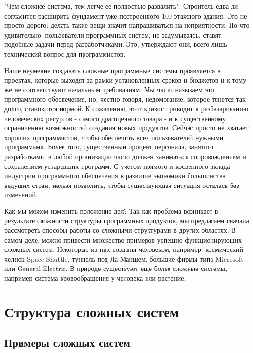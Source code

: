 \documentclass[11pt]{article}
\begin{document}
"Чем сложнее система, тем легче ее полностью развалить". Строитель едва ли согласится расширить фундамент уже построенного 100-этажного здания. Это не просто дорого: делать такие вещи значит напрашиваться на неприятности. Но что удивительно, пользователи программных систем, не задумываясь, ставят подобные задачи перед разработчиками. Это, утверждают они, всего лишь технический вопрос 
для программистов. 
\parskip=2mm
\par
Наше неумение создавать сложные программные системы проявляется в проектах, которые выходят за рамки установленных сроков и бюджетов и к тому же не соответствуют начальным требованиям. Мы часто называем это { программного обеспечения}, но, честно говоря, недомогание, которое тянется так долго, становится нормой. К сожалению, этот кризис приводит к разбазариванию человеческих ресурсов - самого драгоценного товара - и к существенному ограничению возможностей создания новых продуктов. Сейчас просто не хватает хороших программистов, чтобы обеспечить всех пользователей нужными программами. Более того, существенный процент персонала, занятого разработками, в любой организации часто должен заниматься сопровождением и сохранением устаревших программ. С учетом прямого и косвенного вклада индустрии программного обеспечения в развитие экономики большинства ведущих стран, нельзя позволить, чтобы существующая ситуация осталась без изменений. 
\par
Как мы можем изменить положение дел? Так как проблема возникает в результате сложности структуры программных продуктов, мы предлагаем сначала рассмотреть способы работы со сложными структурами в других областях. В самом деле, можно привести множество примеров успешно функционирующих сложных систем. Некоторые из них созданы человеком, например: космический челнок Space Shuttle, туннель под Ла-Маншем, большие фирмы типа Microsoft или General Electric. В природе существуют еще более сложные системы, например система кровообращения у человека или растение.
\parskip=0pt
\section{Структура сложных систем}
\subsection{Примеры сложных систем}
\
\end{document}
